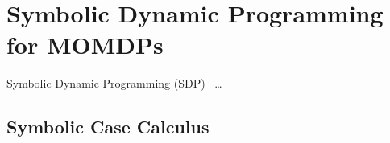 \section{Symbolic Dynamic Programming for MOMDPs}
\label{sec:sdp}

Symbolic Dynamic Programming (SDP)~\parencite{Boutilier_IJCAI_2001} \ldots

\subsection{Symbolic Case Calculus}

%
%
%
